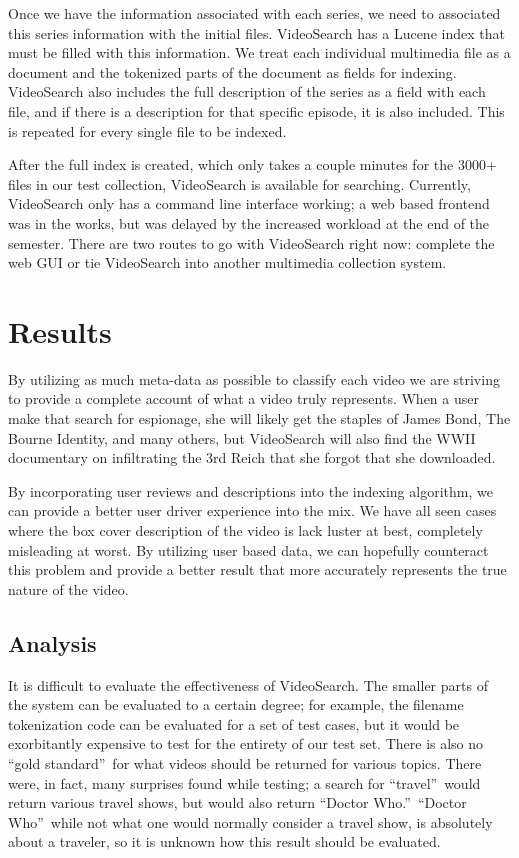 \documentclass{acm_proc_article-sp}
\begin{document}
Once we have the information associated with each series, we need to associated this series information with the initial files.  VideoSearch has a Lucene index that must be filled with this information.  We treat each individual multimedia file as a document and the tokenized parts of the document as fields for indexing.  VideoSearch also includes the full description of the series as a field with each file, and if there is a description for that specific episode, it is also included.  This is repeated for every single file to be indexed.

After the full index is created, which only takes a couple minutes for the 3000+ files in our test collection, VideoSearch is available for searching.  Currently, VideoSearch only has a command line interface working; a web based frontend was in the works, but was delayed by the increased workload at the end of the semester.  There are two routes to go with VideoSearch right now: complete the web GUI or tie VideoSearch into another multimedia collection system.


\section{Results}
    By utilizing as much meta-data as possible to classify each video we are striving to provide a complete account of what a video truly represents. When a user make that search for espionage, she will likely get the staples of James Bond, The Bourne Identity, and many others, but VideoSearch will also find the WWII documentary on infiltrating the 3rd Reich that she forgot that she downloaded.

    By incorporating user reviews and descriptions into the indexing algorithm, we can provide a better user driver experience into the mix. We have all seen cases where the box cover description of the video is lack luster at best, completely misleading at worst. By utilizing user based data, we can hopefully counteract this problem and provide a better result that more accurately represents the true nature of the video.

   


\subsection{Analysis}

It is difficult to evaluate the effectiveness of VideoSearch. The smaller parts of the system can be evaluated to a certain degree; for example, the filename tokenization code can be evaluated for a set of test cases, but it would be exorbitantly expensive to test for the entirety of our test set.  There is also no \textquotedblleft gold standard\textquotedblright\ for what videos should be returned for various topics.  There were, in fact, many surprises found while testing; a search for \textquotedblleft travel\textquotedblright\ would return various travel shows, but would also return \textquotedblleft Doctor Who.\textquotedblright\  \textquotedblleft Doctor Who\textquotedblright\ while not what one would normally consider a travel show, is absolutely about a traveler, so it is unknown how this result should be evaluated.
\end{document}
